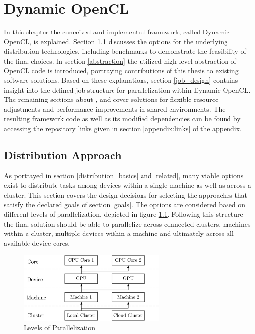\chapter{Dynamic OpenCL}
\label{main}
In this chapter the conceived and implemented framework, called Dynamic OpenCL, is explained. Section \ref{distribution} discusses the options for the underlying distribution technologies, including benchmarks to demonstrate the feasibility of the final choices. In section \ref{abstraction} the utilized high level abstraction of OpenCL code is introduced, portraying contributions of this thesis to existing software solutions. Based on these explanations, section \ref{job_design} contains insight into the defined job structure for parallelization within Dynamic OpenCL. The remaining sections about \textit{}, \textit{} and \textit{} cover solutions for flexible resource adjustments and performance improvements in shared environments. The resulting framework code as well as its modified dependencies can be found by accessing the repository links given in section \ref{appendix:links} of the appendix.

\section{Distribution Approach}
\label{distribution}
As portrayed in section \ref{distribution_basics} and \ref{related}, many viable options exist to distribute tasks among devices within a single machine as well as across a cluster. This section covers the design decisions for selecting the approaches that satisfy the declared goals of section \ref{goals}. The options are considered based on different levels of parallelization, depicted in figure \ref{img:parallelization_levels}. Following this structure the final solution should be able to parallelize across connected clusters, machines within a cluster, multiple devices within a machine and ultimately across all available device cores.

\begin{figure}[H]
	\includegraphics[width=0.65\textwidth]{drawings/parallelization_struct.pdf}
	\centering
	\caption{Levels of Parallelization}
	\label{img:parallelization_levels}
\end{figure}

